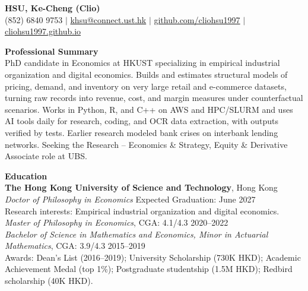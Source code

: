 \documentclass[11pt,letterpaper]{article}
\begin{document}
{\Large \textbf{HSU, Ke-Cheng (Clio)}}\\[1pt]
(852) 6840 9753 \quad $|$ \quad \href{mailto:khsu@connect.ust.hk}{khsu@connect.ust.hk} \quad $|$ \quad \href{https://github.com/cliohsu1997}{github.com/cliohsu1997} \quad $|$ \quad \href{https://cliohsu1997.github.io/}{cliohsu1997.github.io}

\vspace{0.15pt}

{\large \textbf{Professional Summary}}\\[-0.5pt]
PhD candidate in Economics at HKUST specializing in empirical industrial organization and digital economics. Builds and estimates structural models of pricing, demand, and inventory on very large retail and e-commerce datasets, turning raw records into revenue, cost, and margin measures under counterfactual scenarios. Works in Python, R, and C++ on AWS and HPC/SLURM and uses AI tools daily for research, coding, and OCR data extraction, with outputs verified by tests. Earlier research modeled bank crises on interbank lending networks. Seeking the Research -- Economics \& Strategy, Equity \& Derivative Associate role at UBS.

\vspace{0.15pt}

{\large \textbf{Education}}\\[-0.5pt]
\textbf{The Hong Kong University of Science and Technology}, Hong Kong\\
\textit{Doctor of Philosophy in Economics} \hfill Expected Graduation: June 2027\\
Research interests: Empirical industrial organization and digital economics.\\
\textit{Master of Philosophy in Economics}, CGA: 4.1/4.3 \hfill 2020--2022\\
\textit{Bachelor of Science in Mathematics and Economics, Minor in Actuarial Mathematics}, CGA: 3.9/4.3 \hfill 2015--2019\\
Awards: Dean's List (2016--2019); University Scholarship (730K HKD); Academic Achievement Medal (top 1\%); Postgraduate studentship (1.5M HKD); Redbird scholarship (40K HKD).

\vspace{0.15pt}
\end{document}
